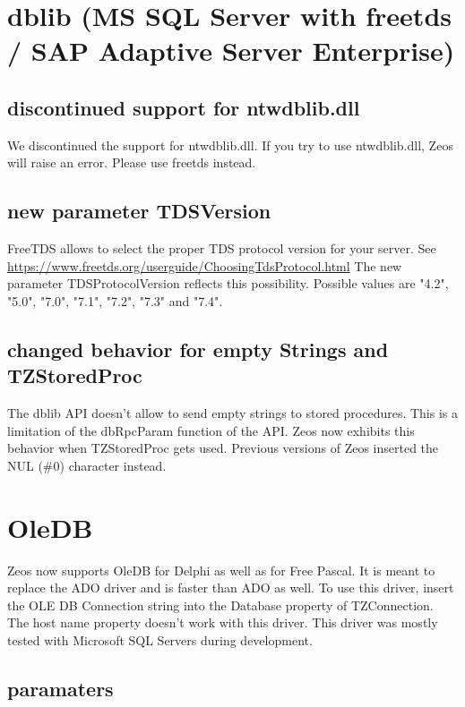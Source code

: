 \documentclass[a4paper,12pt,oneside]{article}
\begin{document}
\FloatBarrier
\section{dblib (MS SQL Server with freetds / SAP Adaptive Server Enterprise)}

\subsection{discontinued support for ntwdblib.dll}
We discontinued the support for ntwdblib.dll.
If you try to use ntwdblib.dll, Zeos will raise an error.
Please use freetds instead.

\subsection{new parameter TDSVersion}
FreeTDS allows to select the proper TDS protocol version for your server.
See \url{https://www.freetds.org/userguide/ChoosingTdsProtocol.html}
The new parameter TDSProtocolVersion reflects this possibility.
Possible values are "4.2", "5.0", "7.0", "7.1", "7.2", "7.3" and "7.4".

\subsection{changed behavior for empty Strings and TZStoredProc}
The dblib API doesn't allow to send empty strings to stored procedures.
This is a limitation of the dbRpcParam function of the API.
Zeos now exhibits this behavior when TZStoredProc gets used.
Previous versions of Zeos inserted the NUL (\#0) character instead.

\section{OleDB}
Zeos now supports OleDB for Delphi as well as for Free Pascal.
It is meant to replace the ADO driver and is faster than ADO as well.
To use this driver, insert the OLE DB Connection string into the Database property of TZConnection.
The host name property doesn't work with this driver.
This driver was mostly tested with Microsoft SQL Servers during development.

\subsection{paramaters}
\end{document}
